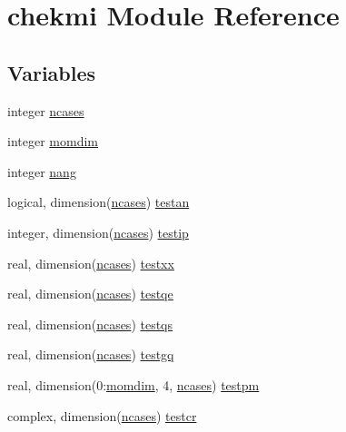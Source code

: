 \hypertarget{namespacechekmi}{}\section{chekmi Module Reference}
\label{namespacechekmi}
\subsection*{Variables}
\begin{DoxyCompactItemize}
\item 
integer \hyperlink{namespacechekmi_a7a072a81d4a96e7c6d537baf67910952}{ncases}
\item 
integer \hyperlink{namespacechekmi_afe35bc0756f5ff0b6d6c0d0e65db8548}{momdim}
\item 
integer \hyperlink{namespacechekmi_a9ea491c5eb26edc65f7b53a39d16bc45}{nang}
\item 
logical, dimension(\hyperlink{namespacechekmi_a7a072a81d4a96e7c6d537baf67910952}{ncases}) \hyperlink{namespacechekmi_ae9b410a3ba35714e6fbf24a148da7138}{testan}
\item 
integer, dimension(\hyperlink{namespacechekmi_a7a072a81d4a96e7c6d537baf67910952}{ncases}) \hyperlink{namespacechekmi_ab52396a3ffb179abce8f932e43f228f8}{testip}
\item 
real, dimension(\hyperlink{namespacechekmi_a7a072a81d4a96e7c6d537baf67910952}{ncases}) \hyperlink{namespacechekmi_a5a77a3570f10bdc7c249a1f737874688}{testxx}
\item 
real, dimension(\hyperlink{namespacechekmi_a7a072a81d4a96e7c6d537baf67910952}{ncases}) \hyperlink{namespacechekmi_aee69cac91029367099c7c9e4aa151153}{testqe}
\item 
real, dimension(\hyperlink{namespacechekmi_a7a072a81d4a96e7c6d537baf67910952}{ncases}) \hyperlink{namespacechekmi_a9451b9e1c1e024ed35194837847e73d3}{testqs}
\item 
real, dimension(\hyperlink{namespacechekmi_a7a072a81d4a96e7c6d537baf67910952}{ncases}) \hyperlink{namespacechekmi_ae461e282eac8b7dd5dffffde9e1cdfcd}{testgq}
\item 
real, dimension(0\+:\hyperlink{namespacechekmi_afe35bc0756f5ff0b6d6c0d0e65db8548}{momdim}, 4, \hyperlink{namespacechekmi_a7a072a81d4a96e7c6d537baf67910952}{ncases}) \hyperlink{namespacechekmi_a3157f6abe6c10bee0ff0e67a35621556}{testpm}
\item 
complex, dimension(\hyperlink{namespacechekmi_a7a072a81d4a96e7c6d537baf67910952}{ncases}) \hyperlink{namespacechekmi_a408f74d09a9da3ca7eb6e98302fec068}{testcr}

\end{DoxyCompactItemize}
